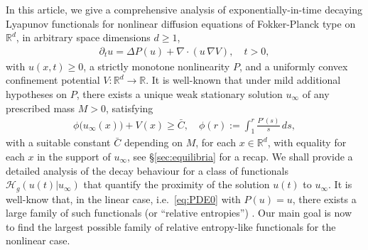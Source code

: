 \documentclass[reqno]{amsart}
\newcommand{\R}{\mathbb{R}}
\newcommand{\dv}{\nabla\cdot}
\begin{document}
In this article, we give a comprehensive analysis of exponentially-in-time decaying Lyapunov functionals
for nonlinear diffusion equations of Fokker-Planck type on $\R^d$, in arbitrary space dimensions $d\ge1$,
\begin{align}
  \label{eq:PDE0}
  \partial_t u = \Delta P(u) + \dv(u\,\nabla V),\quad t>0,
\end{align}
with $u(x,t)\ge0$, a strictly monotone nonlinearity $P$, and a uniformly convex confinement potential $V:\R^d\to\R$. It is well-known \cite{McCann,otto,CJMTU} that under mild additional hypotheses on $P$, there exists a unique weak stationary solution $u_\infty$ of any prescribed mass $M>0$, satisfying
\begin{align*}
  \phi\big(u_\infty(x)\big) + V(x) \ge \bar C,
  \quad
  \phi(r):=\int_1^r\frac{P'(s)}{s}\,ds,
\end{align*}
with a suitable constant $\bar C$ depending on $M$, for each $x\in\R^d$, with equality for each $x$ in the support of $u_\infty$, see \S\ref{sec:equilibria} for a recap. We shall provide a detailed analysis of the decay behaviour for a class of functionals $\mathcal H_g(u(t)|u_\infty)$ that quantify the proximity of the solution $u(t)$ to $u_\infty$. It is well-know that, in the linear case, i.e.\ \eqref{eq:PDE0}  with $P(u)=u$, there exists a large family of such functionals (or ``relative entropies'') \cite{BaEm84, AMTU}. 
Our main goal is now to find the largest possible family of relative entropy-like functionals for the nonlinear case. 
\end{document}
